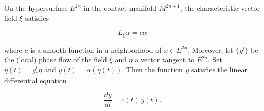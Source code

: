 On the hypersurface $E^{2n}$ in the contact manifold $M^{2n+1}$, the characteristic vector field $\xi$ satisfies

$$L_\xi \alpha = c\alpha$$

where $c$ is a smooth function in a neighborhood of $x \in E^{2n}$. Moreover, let $\{g^t\}$ be the (local) phase flow of the field $\xi$ and $\eta$ a vector tangent to $E^{2n}$. Set $\eta(t) = g^t_* \eta$ and $y(t) = \alpha(\eta(t))$. Then the function $y$ satisfies the linear differential equation

$$\frac{dy}{dt} = c(t)\, y(t).$$
